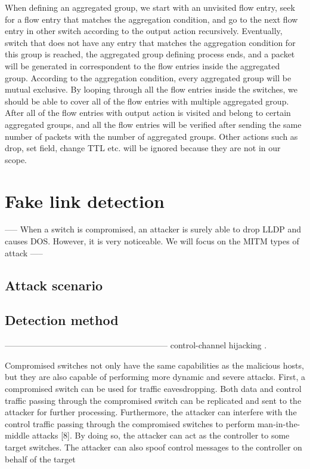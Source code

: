 When defining an aggregated group, we start with an unvisited flow entry, seek for a flow entry that matches the aggregation condition, and go to the next flow entry in other switch according to the output action recursively. Eventually, switch that does not have any entry that matches the aggregation condition for this group is reached, the aggregated group defining process ends, and a packet will be generated in correspondent to the flow entries inside the aggregated group. According to the aggregation condition, every aggregated group will be mutual exclusive. By looping through all the flow entries inside the switches, we should be able to cover all of the flow entries with multiple aggregated group. After all of the flow entries with output action is visited and belong to certain aggregated groups, and all the flow entries will be verified after sending the same number of packets with the number of aggregated groups. Other actions such as drop, set field, change TTL etc. will be ignored because they are not in our scope. 

\section{Fake link detection}

-----
When a switch is compromised, an attacker is surely able to drop LLDP and causes DOS. However, it is very noticeable. We will focus on the MITM types of attack
-----
\subsection{Attack scenario}
\subsection{Detection method}


-----------------------------------------------------------
control-channel hijacking \cite{AAS14}. 

Compromised switches not only have the same capabilities as the malicious hosts, but they are also capable of performing more dynamic and severe attacks.
First, a compromised switch can be used for traffic eavesdropping. Both data and control traffic passing through the compromised switch can be replicated and sent to the attacker for further processing. Furthermore, the attacker can interfere with the control traffic passing through the compromised
switches to perform man-in-the-middle attacks [8]. By doing so, the
attacker can act as the controller to some target switches. The attacker can
also spoof control messages to the controller on behalf of the target

